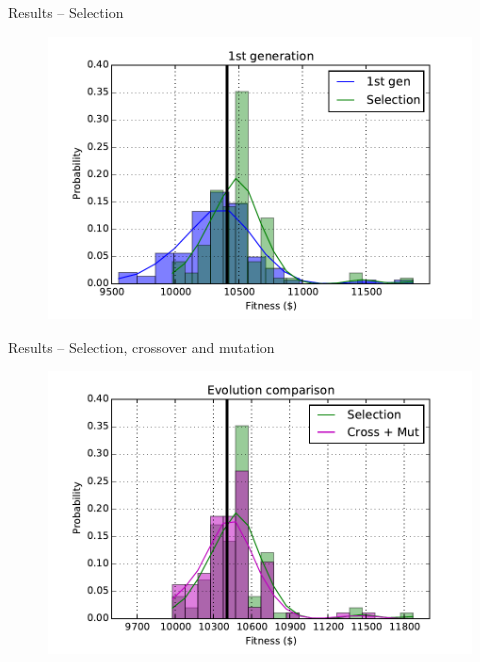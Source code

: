 \documentclass[12pt,portuguese]{beamer}
\begin{document}
\begin{frame}{Results -- Selection}
	\begin{figure}[h]
	\centering
	\includegraphics[width=0.9\columnwidth]{images/01l_100_sel1.pdf}
	\end{figure}
\end{frame}

\begin{frame}{Results -- Selection, crossover and mutation}
	\begin{figure}[h]
	\centering
	\includegraphics[width=0.9\columnwidth]{images/01l_100_cr_mut.pdf}
	\end{figure}
\end{frame}
\end{document}
